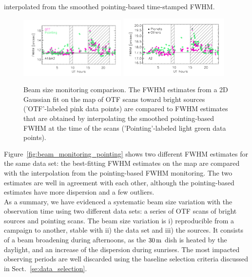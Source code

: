 interpolated from the smoothed pointing-based time-stamped FWHM.
%
\begin{figure}[ht!]
  \begin{center}
    \includegraphics[clip=true, trim={0.9cm, 0.5cm, 0.5cm, 0.5cm}, width=0.4725\textwidth]{Figures/Beams/Beam_monitoring_with_otfs_vs_ut_compare_pointings_1mm.pdf}
    \includegraphics[clip=true, trim={0.5cm, 0.5cm, 0.5cm, 0.5cm}, width=0.4875\textwidth]{Figures/Beams/Beam_monitoring_with_otfs_vs_ut_compare_pointings_a2.pdf}
    \caption[Beam size monitoring comparison]{Beam size monitoring
      comparison. The FWHM estimates from a 2D Gaussian fit on the map
      of OTF scans toward bright sources ('OTF'-labeled pink data
      points) are compared to FWHM estimates that are obtained by
      interpolating the smoothed pointing-based FWHM at the time of
      the scans ('Pointing'-labeled light green data points).}
\label{fig:beam_monitoring_compare}
\end{center}
\end{figure}
%
Figure~\ref{fig:beam_monitoring_pointing} shows two different FWHM
estimates for the same data set: the best-fitting FWHM estimates on
the map are compared with the interpolation from the pointing-based
FWHM monitoring. The two estimates are well in agreement with each
other, although the pointing-based estimates have more dispersion and
a few outliers.\\

As a summary, we have evidenced a systematic beam size variation with
the observation time using two different data sets: a series of OTF
scans of bright sources and pointing scans. The beam size
variation is i) reproducible from a campaign to another, stable
with ii) the data set and iii) the sources. It consists of a beam
broadening during afternoons, as the $30\,\rm{m}$ dish is heated by
the daylight, and
an increase of the dispersion during sunrises. The most impacted
observing periods are well discarded using the baseline selection
criteria discussed in Sect.~\ref{se:data_selection}.


